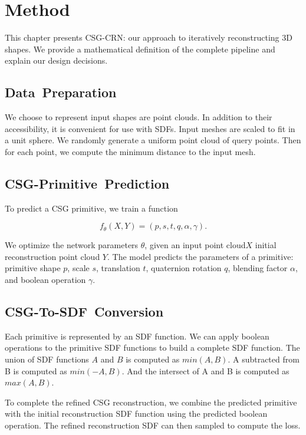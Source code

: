 
\chapter{Method}
\label{chap:method}

This chapter presents CSG-CRN: our approach to iteratively reconstructing 3D shapes. We provide a mathematical definition of the complete pipeline and explain our design decisions.


\section{Data~Preparation}
\label{sec:data_preparation}

We choose to represent input shapes are point clouds. In addition to their accessibility, it is convenient for use with SDFs. Input meshes are scaled to fit in a unit sphere. We randomly generate a uniform point cloud of query points. Then for each point, we compute the minimum distance to the input mesh. 


\section{CSG-Primitive~Prediction}
\label{sec:csg_primitive_prediction}

To predict a CSG primitive, we train a function

\[f_\theta (X, Y) = (p, s, t, q, \alpha, \gamma).\]

We optimize the network parameters $\theta$, given an input point cloud$X$ initial reconstruction point cloud $Y$. The model predicts the parameters of a primitive: primitive shape $p$, scale $s$, translation $t$, quaternion rotation $q$, blending factor $\alpha$, and boolean operation $\gamma$.


\section{CSG-To-SDF~Conversion}
\label{sec:csg_to_sdf_conversion}

Each primitive is represented by an SDF function. We can apply boolean operations to the primitive SDF functions to build a complete SDF function. The union of SDF functions $A$ and $B$ is computed as $min(A, B)$. A subtracted from B is computed as $min(-A, B)$. And the intersect of A and B is computed as $max(A, B)$.

To complete the refined CSG reconstruction, we combine the predicted primitive with the initial reconstruction SDF function using the predicted boolean operation. The refined reconstruction SDF can then sampled to compute the loss.


